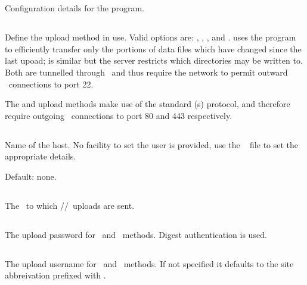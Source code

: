\section{\code{[upload]}}
Configuration details for the  program.

\subsection{}
Define the upload method in use. Valid options are: ,
, , and .  uses the
 program to efficiently transfer only the portions of
data files which have changed since the last upoad;  is
similar but the server restricts which directories may be written
to. Both are tunnelled through \ssh\ and thus require the network to
permit outward \tcp\ connections to port 22.

The  and  upload methods make use of the standard
\http(s) protocol, and therefore require outgoing \tcp\ connections to
port 80 and 443 respectively. 

\subsection{}
Name of the  host. No facility to set the user is
provided, use the \ssh\  file to set the
appropriate details.

Default: none.


\subsection{}
The \URL\ to which \http/\slash \https\ uploads are sent.

\subsection{}
The upload password for \http\ and \https\ methods. Digest
authentication is used.

\subsection{}
The upload username for \http\ and \https\ methods. If not specified
it defaults to the site abbreivation prefixed with .

